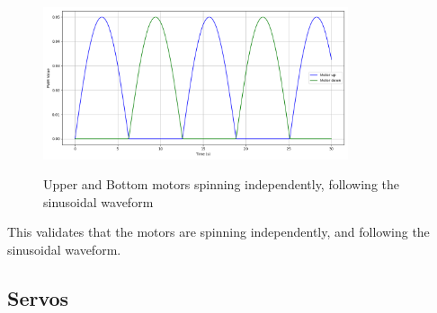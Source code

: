 \documentclass[a4paper]{article}
\begin{document}
\begin{figure}[H]
    \centering
    \label{fig:demo_motor_pwm}
    \includegraphics[width=0.8\textwidth]{imgs/demo_data/motor_pwm.png}
    \\
    \hspace{3pt}%
    \caption{Upper and Bottom motors spinning independently, following the sinusoidal waveform}
\end{figure}

This validates that the motors are spinning independently, and following the sinusoidal waveform.

\subsection{Servos}
\end{document}
